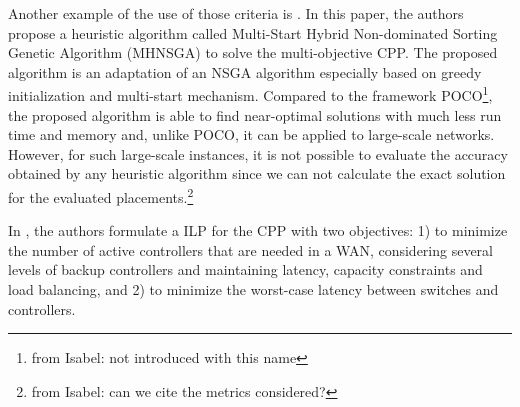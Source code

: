 \documentclass{IEEEtran}
\newcommand\fia[1]{{\color{red}\footnote{\color{red}from Isabel: #1}}} %
\begin{document}
Another example of the use of those criteria is \cite{VaMo18}. In this paper, the authors propose a heuristic algorithm called Multi-Start Hybrid Non-dominated Sorting Genetic Algorithm (MHNSGA) to solve the multi-objective CPP. The proposed algorithm is an adaptation of an NSGA algorithm especially based on greedy initialization and multi-start mechanism. Compared to the framework POCO\fia{not introduced with this name}, the proposed algorithm is able to find near-optimal solutions with much less run time and memory and, unlike POCO, it can be applied to large-scale networks. However, for such large-scale instances, it is not possible to evaluate the accuracy obtained by any heuristic algorithm since we can not calculate the exact solution for the evaluated placements.\fia{can we cite the metrics considered?}%

In \cite{PeRe16}, the authors formulate a ILP for the CPP with two objectives: 1) to minimize the number of active controllers that are needed in a WAN, considering several levels of backup controllers and maintaining latency, capacity constraints and load balancing, and 2) to minimize the worst-case latency between switches and controllers. 
\end{document}
